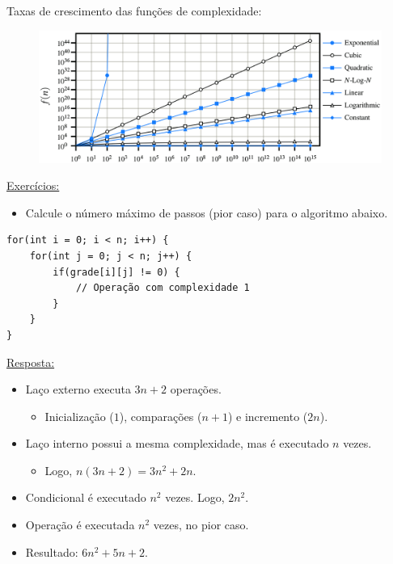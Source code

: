 \medskip

Taxas de crescimento das funções de complexidade:

\begin{figure}[H]
	\centering
	\includegraphics[width=0.79\linewidth]{img/comparacao-funcoes}
\end{figure}

\clearpage

\underline{Exercícios:}
\begin{itemize}
	\item Calcule o número máximo de passos (pior caso) para o algoritmo abaixo.
\end{itemize}

\begin{verbatim}
for(int i = 0; i < n; i++) {
	for(int j = 0; j < n; j++) {
		if(grade[i][j] != 0) {
			// Operação com complexidade 1
		}
	}
}
\end{verbatim}

\medskip

{\color{redtext}
\underline{Resposta:}
\begin{itemize}
	\item Laço externo executa $3n + 2$ operações.
	\begin{itemize}
		\item Inicialização ($1$), comparações ($n + 1$) e incremento ($2n$).
	\end{itemize}
	\item Laço interno possui a mesma complexidade, mas é executado $n$ vezes.
	\begin{itemize}
		\item Logo, $n(3n + 2) = 3n^2 + 2n$.
	\end{itemize}
	\item Condicional é executado $n^2$ vezes. Logo, $2n^2$.
	\item Operação é executada $n^2$ vezes, no pior caso.
	\item Resultado: $6n^2 + 5n + 2$.
\end{itemize}
}

\medskip


